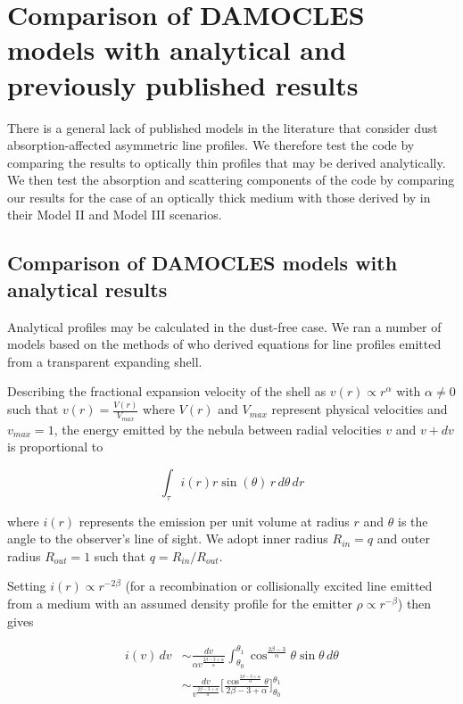 \documentclass[useAMS,usenatbib,usegraphicx]{mnras}
\begin{document}
\section{Comparison of DAMOCLES models with analytical and previously published results}
\label{params}

There is a general lack of published models in the literature that 
consider dust absorption-affected asymmetric line profiles.  We therefore test 
the code by comparing the results to optically thin profiles that may be 
derived analytically.  We then test the absorption and scattering 
components of the code by comparing our results for the case of an 
optically thick medium with those derived by \citet{Lucy1989} in their 
Model II and Model III scenarios.

\subsection{Comparison of DAMOCLES models with analytical results}
\label{analytics}

Analytical profiles may be calculated in the dust-free case.  We ran a 
number of models based on the methods of \cite{Gerasimovic1933} 
who derived equations for line profiles emitted from a transparent 
expanding shell.

Describing the fractional expansion velocity of the shell as $v(r) \propto r^\alpha$ with 
$\alpha \neq 0$ such that $v(r)=\frac{V(r)}{V_{max}}$ where $V(r)$ and $V_{max}$ represent physical velocities and $v_{max}=1$, the energy emitted by 
the nebula between radial velocities $v$ and $v+dv$ is proportional to

\begin{equation}
\int _\tau i(r) r \sin (\theta) \, r \, d\theta \, dr
\end{equation}

\noindent where $i(r)$ represents the emission per unit volume at radius 
$r$ and $\theta$ is the angle to the observer's line of sight.  We adopt inner radius $R_{in}=q$  and outer radius $R_{out}=1$ such that $q=R_{in}/R_{out}$.


Setting $i(r) \propto r^{-2\beta}$ (for a recombination or collisionally excited line emitted from 
a medium with an assumed density profile for the emitter $\rho \propto 
r^{-\beta}$) then gives

\begin{equation}
\begin{split}
i(v) \, dv &\sim \frac{dv}{\alpha v^{\frac{2\beta-3+\alpha}{\alpha}}} \int^{\theta_1}_{\theta_0} \cos^{\frac{2\beta-3}{\alpha}} \theta \sin \theta \, d\theta 
\\
&\sim  \frac{dv}{v^{\frac{2\beta-3+\alpha}{\alpha}}} \Bigg[\frac{\cos^{\frac{2\beta - 3 + \alpha}{\alpha}} \theta}{2\beta -3 + \alpha}\Bigg]^{\theta_1}_{\theta_0}
\end{split}
\end{equation}
\end{document}

